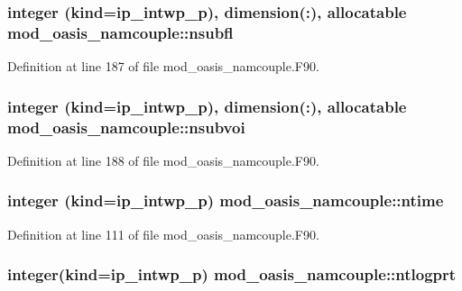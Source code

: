 \hypertarget{classmod__oasis__namcouple_a6a94577996b440c31cac5b7d39e7f47a}{
\subsubsection[{nsubfl}]{\setlength{\rightskip}{0pt plus 5cm}integer (kind=ip\+\_\+intwp\+\_\+p), dimension(\+:), allocatable mod\+\_\+oasis\+\_\+namcouple\+::nsubfl\hspace{0.3cm}{\ttfamily [private]}}}\label{classmod__oasis__namcouple_a6a94577996b440c31cac5b7d39e7f47a}


Definition at line 187 of file mod\+\_\+oasis\+\_\+namcouple.\+F90.

\hypertarget{classmod__oasis__namcouple_a0f31605257bfe125aafb6488a5065d4d}{
\subsubsection[{nsubvoi}]{\setlength{\rightskip}{0pt plus 5cm}integer (kind=ip\+\_\+intwp\+\_\+p), dimension(\+:), allocatable mod\+\_\+oasis\+\_\+namcouple\+::nsubvoi\hspace{0.3cm}{\ttfamily [private]}}}\label{classmod__oasis__namcouple_a0f31605257bfe125aafb6488a5065d4d}


Definition at line 188 of file mod\+\_\+oasis\+\_\+namcouple.\+F90.

\hypertarget{classmod__oasis__namcouple_a8a962108487c3ca092633bd4292dbfd6}{
\subsubsection[{ntime}]{\setlength{\rightskip}{0pt plus 5cm}integer (kind=ip\+\_\+intwp\+\_\+p) mod\+\_\+oasis\+\_\+namcouple\+::ntime\hspace{0.3cm}{\ttfamily [private]}}}\label{classmod__oasis__namcouple_a8a962108487c3ca092633bd4292dbfd6}


Definition at line 111 of file mod\+\_\+oasis\+\_\+namcouple.\+F90.

\hypertarget{classmod__oasis__namcouple_a49bd874b06648257f7ce70da19a678b4}{
\subsubsection[{ntlogprt}]{\setlength{\rightskip}{0pt plus 5cm}integer(kind=ip\+\_\+intwp\+\_\+p) mod\+\_\+oasis\+\_\+namcouple\+::ntlogprt\hspace{0.3cm}{\ttfamily [private]}}}\label{classmod__oasis__namcouple_a49bd874b06648257f7ce70da19a678b4}


